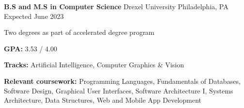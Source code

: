 

\begin{cventries}

  \cventry
  {\textbf{B.S and M.S in Computer Science}} %
  {Drexel University} %
  {Philadelphia, PA} %
  {Expected June 2023} %
  {
    \begin{cvitems} %
      \item {Two degrees as part of accelerated degree program}
      \item {\textbf{GPA:} 3.53 / 4.00}
      \item {\textbf{Tracks:} Artificial Intelligence, Computer Graphics \& Vision}
      \item {\color{darktext} \textbf{Relevant coursework:}
        Programming Languages,
        Fundamentals of Databases,
        Software Design,
        Graphical User Interfaces,
        Software Architecture I,
        Systems Architecture,
        Data Structures,
        Web and Mobile App Development
      }
    \end{cvitems}
  } 

\end{cventries}

